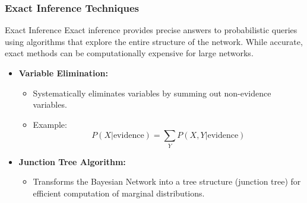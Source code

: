 \documentclass[aspectratio=169]{beamer}
\begin{document}
\begin{frame}[fragile]
    \frametitle{Exact Inference Techniques}
    \begin{block}{Exact Inference}
        Exact inference provides precise answers to probabilistic queries using algorithms that explore the entire structure of the network.
        While accurate, exact methods can be computationally expensive for large networks.
    \end{block}

    \begin{itemize}
        \item \textbf{Variable Elimination:}
        \begin{itemize}
            \item Systematically eliminates variables by summing out non-evidence variables.
            \item Example:
            \[
            P(X | \text{evidence}) = \sum_Y P(X, Y | \text{evidence})
            \]
        \end{itemize}
        
        \item \textbf{Junction Tree Algorithm:}
        \begin{itemize}
            \item Transforms the Bayesian Network into a tree structure (junction tree) for efficient computation of marginal distributions.
        \end{itemize}
    \end{itemize}
\end{frame}
\end{document}
